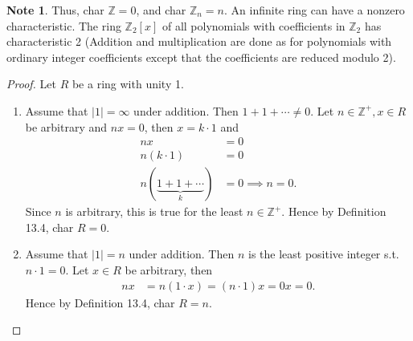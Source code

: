 \documentclass{article}
\newtheorem{theorem}{Theorem}[section]
\theoremstyle{definition}
\newtheorem{note}{Note}[section]
\begin{document}
\begin{note}
    Thus, char $\mathbb{Z}=0$, and char $\mathbb{Z}_n=n$. An infinite ring can have a nonzero characteristic. The ring $\mathbb{Z}_2[x]$ of all polynomials with coefficients in $\mathbb{Z}_2$ has characteristic 2 (Addition and multiplication are done as for polynomials with ordinary integer coefficients except that the coefficients are reduced modulo 2). 
\end{note}

\noindent{}

\begin{proof}
     Let $R$ be a ring with unity 1.
     \begin{enumerate}
         \item Assume that $|1|=\infty$ under addition. Then $1+1+\cdots\neq0$. Let $n\in\mathbb{Z}^+, x\in R$ be arbitrary and $nx=0$, then $x=k\cdot1$ and
         \begin{align*}
             nx&=0 \\
             n(k\cdot1)&=0 \\
             n(\underbrace{1+1+\cdots}_k)&=0 \implies n=0.
         \end{align*}
         Since $n$ is arbitrary, this is true for the least $n\in\mathbb{Z}^+$. Hence by Definition 13.4, char $R=0$.
         
         \item Assume that $|1|=n$ under addition. Then $n$ is the least positive integer s.t. $n\cdot1=0$. Let $x\in R$ be arbitrary, then
         \begin{align*}
             nx&=n(1\cdot x)=(n\cdot1)x=0x=0.
         \end{align*}
         Hence by Definition 13.4, char $R=n$.
     \end{enumerate}
\end{proof}

\noindent{}
\end{document}
